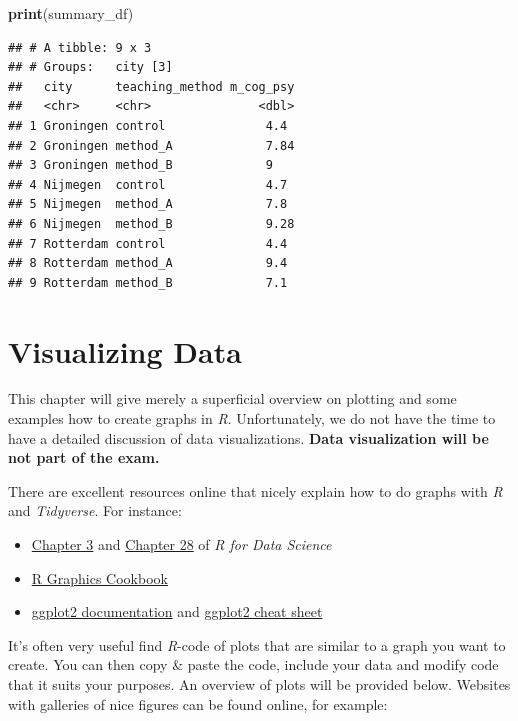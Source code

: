 \documentclass[
]{scrartcl}
\newenvironment{Shaded}{\begin{snugshade}}{\end{snugshade}}
\newcommand{\FunctionTok}[1]{\textcolor[rgb]{0.13,0.29,0.53}{\textbf{#1}}}
\newcommand{\NormalTok}[1]{#1}
\providecommand{\tightlist}{%
  \setlength{\itemsep}{0pt}\setlength{\parskip}{0pt}}
\begin{document}
\begin{Shaded}
\begin{Highlighting}[]
\FunctionTok{print}\NormalTok{(summary\_df)}
\end{Highlighting}
\end{Shaded}

\begin{verbatim}
## # A tibble: 9 x 3
## # Groups:   city [3]
##   city      teaching_method m_cog_psy
##   <chr>     <chr>               <dbl>
## 1 Groningen control              4.4 
## 2 Groningen method_A             7.84
## 3 Groningen method_B             9   
## 4 Nijmegen  control              4.7 
## 5 Nijmegen  method_A             7.8 
## 6 Nijmegen  method_B             9.28
## 7 Rotterdam control              4.4 
## 8 Rotterdam method_A             9.4 
## 9 Rotterdam method_B             7.1
\end{verbatim}

\hypertarget{visualizing-data}{%
\section{Visualizing Data}\label{visualizing-data}}

This chapter will give merely a superficial overview on plotting and some examples how to create graphs in \emph{R}. Unfortunately, we do not have the time to have a detailed discussion of data visualizations. \textbf{Data visualization will be not part of the exam.}

There are excellent resources online that nicely explain how to do graphs with \emph{R} and \emph{Tidyverse}. For instance:

\begin{itemize}
\tightlist
\item
  \href{http://r4ds.had.co.nz/data-visualisation.html}{Chapter 3} and \href{Chapter\%2028:\%20Graphics\%20for\%20communication}{Chapter 28} of \emph{R for Data Science}
\item
  \href{http://www.cookbook-r.com/Graphs/}{R Graphics Cookbook}
\item
  \href{https://ggplot2.tidyverse.org/reference/}{ggplot2 documentation} and \protect\hyperlink{cheatsheets}{ggplot2 cheat sheet}
\end{itemize}

It's often very useful find \emph{R}-code of plots that are similar to a graph you want to create. You can then copy \& paste the code, include your data and modify code that it suits your purposes. An overview of plots will be provided below. Websites with galleries of nice figures can be found online, for example:
\end{document}
